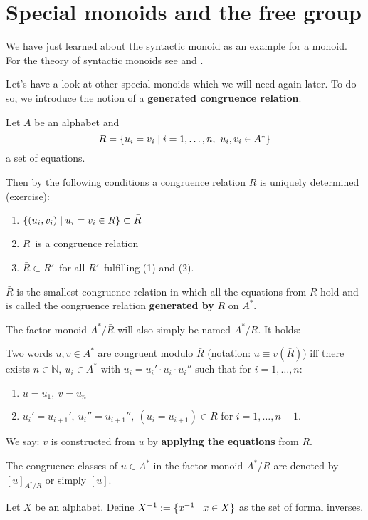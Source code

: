 \section{Special monoids and the free group}

We have just learned about the syntactic monoid as an example for a monoid. For
the theory of syntactic monoids see \cite{Salomaa} and \cite{Perrot}.

Let's have a look at other special monoids which we will need again later. To do
so, we introduce the notion of a {\bf generated congruence relation}.

Let $A$ be an alphabet and
\[ R = \mbox{$\{u_i = v_i \mid i = 1, \ldots, n,\ u_i, v_i \in A^*\}$} \] 
a set of equations.

Then by the following conditions a congruence relation $\bar{R}$ is uniquely
determined (exercise):
\begin{enumerate}
  \item $\mbox{$\{(u_i, v_i) \mid u_i = v_i \in R\}$} \subset \bar{R}$
  \item $\bar{R}$\ is a congruence relation
  \item $\bar{R} \subset R'$\ for all $R'$\ fulfilling (1) and (2).
\end{enumerate}

$\bar{R}$ is the smallest congruence relation in which all
the equations from $R$ hold and is called the congruence relation 
{\bf generated by} $R$ on $A^*$.

The factor monoid $A^*/\bar{R}$ will also simply be named $A^*/R$. It holds:

Two words $u, v \in A^*$ are congruent modulo $\bar{R}$ (notation: $u
\equiv v (\bar{R})$) iff there exists $n \in \mathbb{N},\ u_i \in A^*$ with $u_i
= u_i' \cdot u_i \cdot u_i''$ such that for $i = 1, \ldots, n$:
\begin{enumerate}
  \item $u = u_1,\ v = u_n$
  \item $u_i' = u_{i+1}',\ u_{i}'' = u_{i+1}'',\ (u_{i} = u_{i+1}) \in R$ 
  for $i = 1, \ldots, n-1$.
\end{enumerate}

We say: $v$ is constructed from $u$ by {\bf applying the equations} from $R$.

The congruence classes of $u \in A^*$ in the factor monoid $A^*/R$ are denoted
by $[u]_{A^*/R}$ or simply $[u]$.

\begin{definition}
Let $X$ be an alphabet. Define $X^{-1} := \mbox{$\{x^{-1} \mid x \in X\}$}$ as the
set of formal inverses.
\end{definition}

